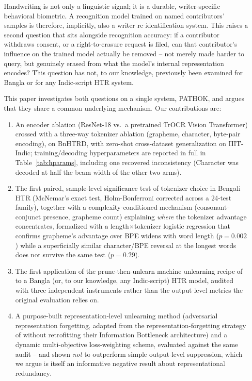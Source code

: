 \documentclass[a4paper,fleqn]{cas-dc}
\begin{document}
Handwriting is not only a linguistic signal; it is a durable,
writer-specific behavioral biometric. A recognition model trained on named
contributors' samples is therefore, implicitly, also a writer
re-identification system. This raises a second question that sits
alongside recognition accuracy: if a contributor withdraws consent, or a
right-to-erasure request is filed, can that contributor's influence on the
trained model actually be removed -- not merely made harder to query, but
genuinely erased from what the model's internal representation encodes?
This question has not, to our knowledge, previously been examined for
Bangla or for any Indic-script HTR system.

This paper investigates both questions on a single system, PATHOK, and
argues that they share a common underlying mechanism. Our contributions
are:

\begin{enumerate}
\item An encoder ablation (ResNet-18 vs.\ a pretrained TrOCR Vision
  Transformer) crossed with a three-way tokenizer ablation (grapheme,
  character, byte-pair encoding), on BnHTRD, with zero-shot cross-dataset
  generalization on IIIT-Indic; training/decoding hyperparameters are
  reported in full in Table~\ref{tab:hparams}, including one recovered
  inconsistency (Character was decoded at half the beam width of the
  other two arms).
\item The first paired, sample-level significance test of tokenizer choice
  in Bengali HTR (McNemar's exact test, Holm-Bonferroni corrected across a
  24-test family), together with a complexity-conditioned mechanism
  (consonant-conjunct presence, grapheme count) explaining \emph{where}
  the tokenizer advantage concentrates, formalized with a length$\times$tokenizer
  logistic regression that confirms grapheme's advantage over BPE widens
  with word length ($p=0.002$) while a superficially similar
  character/BPE reversal at the longest words does not survive the same
  test ($p=0.29$).
\item The first application of the prune-then-unlearn machine unlearning
  recipe of \citet{kang2026privacy} to a Bangla (or, to our knowledge, any
  Indic-script) HTR model, audited with three independent instruments
  rather than the output-level metrics the original evaluation relies on.
\item A purpose-built representation-level unlearning method (adversarial
  representation forgetting, adapted from the representation-forgetting
  strategy of \citet{wang2026rfuss} without retrofitting their Information
  Bottleneck architecture) and a dynamic multi-objective loss-weighting
  scheme, evaluated against the same audit -- and shown \emph{not} to
  outperform simple output-level suppression, which we argue is itself an
  informative negative result about representational redundancy.
\end{enumerate}
\end{document}
